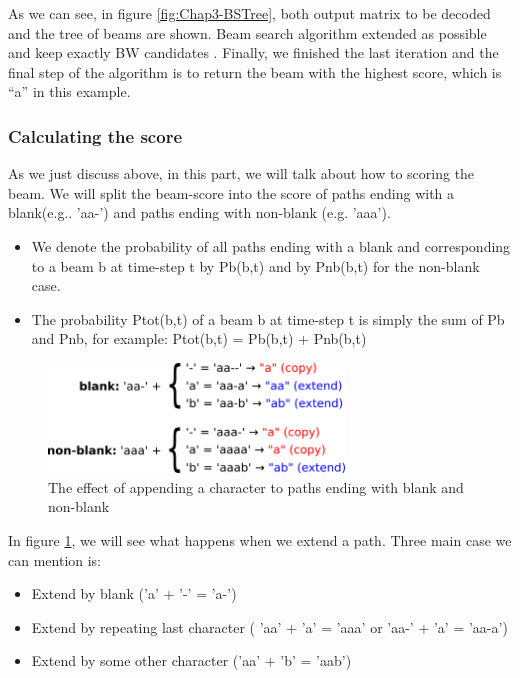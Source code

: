       As we can see, in figure \ref{fig:Chap3-BSTree}, both output matrix to be decoded and the tree of beams are shown. 
      Beam search algorithm extended as possible and keep exactly BW candidates . Finally,
      we finished the last iteration and the final step of the algorithm is to return the beam 
      with the highest score, which is “a” in this example.
      
      \subsubsection{ Calculating the score }
      As we just discuss above, in this part, we will talk about how to scoring the beam.
      We will split the beam-score into the score of paths ending with a blank(e.g.. 'aa-')
      and paths ending with non-blank (e.g. 'aaa'). 
      \begin{itemize}
        \item We denote the probability of all paths ending with a blank and corresponding to a beam b at time-step t 
        by Pb(b,t) and by Pnb(b,t) for the non-blank case.
        \item The probability Ptot(b,t) of a beam b at time-step t is simply the sum of Pb and Pnb, for example:
        Ptot(b,t) = Pb(b,t) + Pnb(b,t)
      \end{itemize}

      \begin{figure}[H]
        \centering
        \includegraphics[width=0.7\textwidth]{img/Chap3/CTC_Scoring}
        \caption{ The effect of appending a character to paths ending with blank and non-blank }
        \label{fig:Chap3-CTC_Scoring}
      \end{figure}

      In figure \ref{fig:Chap3-CTC_Scoring}, we will see what happens when we extend a path. Three main case we can mention
      is:
      \begin{itemize}
        \item Extend by blank ('a' + '-' = 'a-')
        \item Extend by repeating last character ( 'aa' + 'a' = 'aaa' or 'aa-' + 'a' = 'aa-a')
        \item Extend by some other character ('aa' + 'b' = 'aab')
      \end{itemize}

